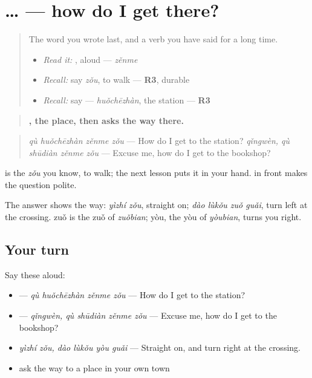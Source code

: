 \section[\texorpdfstring{\zh{去}…\zh{怎么走} (qù … zěnme zǒu)}{去…怎么走 (qù … zěnme zǒu)}]{… — how do I get there?}

\label{lesson:ZH-C283-zenme-zou}



\begin{quote}
The word you wrote last, and a verb you have said for a long time.

\begin{itemize}
\raggedright
  \item \emph{Read it:} , aloud — \emph{zěnme}
  \item \emph{Recall:} say \emph{zǒu}, to walk — \textbf{R3}, durable
  \item \emph{Recall:} say  — \emph{huǒchēzhàn}, the station — \textbf{R3}
\end{itemize}
\end{quote}

\begin{grammarlens}[title={Grammar Lens: \zh{去} … \zh{怎么走}, asking the way}]
\begin{quote}
\textbf{, the place, then  asks the way there.}
\end{quote}

\begin{quote}
\textbf{} \emph{qù huǒchēzhàn zěnme zǒu} — How do I get to the station? \textbf{ } \emph{qǐngwèn, qù shūdiàn zěnme zǒu} — Excuse me, how do I get to the bookshop?
\end{quote}

 is the \emph{zǒu} you know, to walk; the next lesson puts it in your hand.  in front makes the question polite.

The answer shows the way: \emph{yìzhí zǒu}, straight on; \emph{dào lùkǒu zuǒ guǎi}, turn left at the crossing. zuǒ is the zuǒ of \emph{zuǒbian}; yòu, the yòu of \emph{yòubian}, turns you right.
\end{grammarlens}

\subsection*{Your turn}
Say these aloud:

\begin{itemize}
\raggedright
  \item {} — \emph{qù huǒchēzhàn zěnme zǒu} — How do I get to the station?
  \item {}  — \emph{qǐngwèn, qù shūdiàn zěnme zǒu} — Excuse me, how do I get to the bookshop?
  \item \emph{yìzhí zǒu, dào lùkǒu yòu guǎi} — Straight on, and turn right at the crossing.
  \item ask the way to a place in your own town
\end{itemize}

